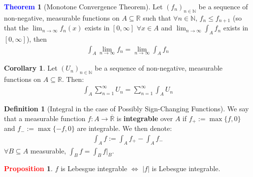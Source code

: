\documentclass[reqno,11pt]{amsart}
\theoremstyle{definition}
\newcommand{\bb}[1]{\mathbb{#1}}
\newtheorem{theorem}{\textcolor{blue}{Theorem}}
\newtheorem{corollary}{Corollary}
\theoremstyle{definition}
\newtheorem{definition}{\textcolor{OliveGreen}{Definition}}
\newtheorem{prop}{\textcolor{red}{Proposition}}
\theoremstyle{remark}
\begin{document}
\begin{theorem}[Monotone Convergence Theorem]
	Let $(f_n)_{n \in \bb{N}}$ be a sequence of non-negative, measurable functions on $A \subseteq \bb{R}$ such that $\forall n \in \bb{N}$, $f_n \leq f_{n+1}$ (so that the $\lim_{n \rightarrow \infty} f_n(x) $ exists in $[0, \infty]$ $\forall x \in A$ and $\lim_{n \rightarrow \infty} \int_A f_n $ exists in $[0, \infty]$), then 
	\begin{align}
		\int_A \lim_{n \rightarrow \infty} f_n = \lim_{n \rightarrow \infty} \int_A f_n
	\end{align}
\end{theorem}

\begin{corollary} Let $(U_n)_{n \in \bb{N}}$ be a sequence of non-negative, measurable functions on $A \subseteq \bb{R}$. Then: 
\begin{align}
	\int_A \sum_{n=1}^\infty U_n = \sum_{n=1}^\infty \int_A U_n
\end{align}
\end{corollary}

\begin{definition}[Integral in the case of Possibly Sign-Changing Functions]
	We say that a measurable function $f: A \rightarrow \overline{\bb{R}}$ is \textbf{integrable} over $A$ if $f_+ := \max\{ f, 0 \}$ and $f_- := \max\{ -f, 0 \}$ are integrable. We then denote: 
	\begin{align}
		\int_A f := \int_A f_+ - \int_A f_-
	\end{align}
	$\forall B \subseteq A$ measurable, $\int_B f = \int_B f|_B$. 
\end{definition}

\begin{prop}
	$f$ is Lebesgue integrable $\iff$ $|f|$ is Lebesgue integrable. 
\end{prop}
\end{document}
